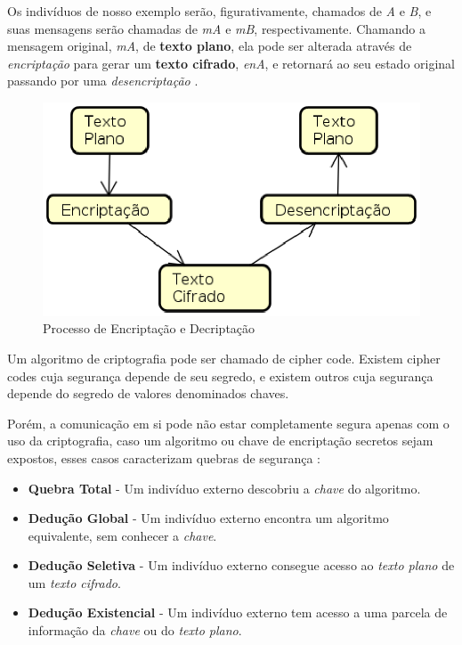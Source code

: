 	Os indivíduos de nosso exemplo serão, figurativamente, chamados de \textit{A} e \textit{B}, e suas mensagens serão chamadas de \textit{mA} e \textit{mB}, respectivamente. Chamando a mensagem original, \textit{mA}, de \textbf{texto plano}, ela pode ser alterada através de \textit{encriptação} para gerar um \textbf{texto cifrado}, \textit{enA}, e retornará ao seu estado original passando por uma \textit{desencriptação} \cite[p.~15]{schneier96}.

	\begin{figure}[h]
		\centering
		\label{img01}
		\caption{Processo de Encriptação e Decriptação}
		\includegraphics[keepaspectratio=true,scale=0.5]{figuras/proc.eps}
	\end{figure}

	Um algoritmo de criptografia pode ser chamado de cipher code. Existem cipher codes cuja segurança depende de seu segredo, e existem outros cuja segurança depende do segredo de valores denominados chaves.
	
	Porém, a comunicação em si pode não estar completamente segura apenas com o uso da criptografia, caso um algoritmo ou chave de encriptação secretos sejam expostos, esses casos caracterizam quebras de segurança \cite[p.~399]{stallings11}:
	
	\begin{itemize}
		\item \textbf{Quebra Total} - Um indivíduo externo descobriu a \textit{chave} do algoritmo.
		\item \textbf{Dedução Global} - Um indivíduo externo encontra um algoritmo equivalente, sem conhecer a \textit{chave}.
		\item \textbf{Dedução Seletiva} - Um indivíduo externo consegue acesso ao \textit{texto plano} de um \textit{texto cifrado}.
		\item \textbf{Dedução Existencial} - Um indivíduo externo tem acesso a uma parcela de informação da \textit{chave} ou do \textit{texto plano}. 
	\end{itemize}

